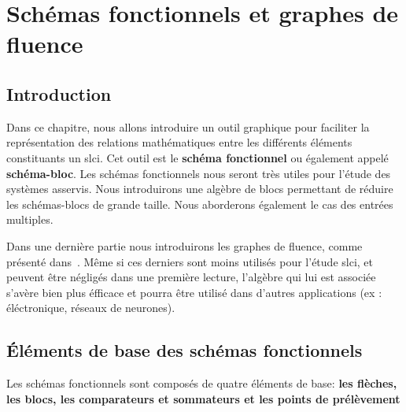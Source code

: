 \chapter[Schéma fonctionnels]{Schémas fonctionnels et graphes de fluence\label{chap-schemabloc}}

\minitoc
\newpage
\section{Introduction}
Dans ce chapitre, nous allons introduire un outil graphique pour faciliter 
la représentation des relations mathématiques entre les différents 
éléments constituants un \gls{slci}. Cet outil est le \textbf{schéma fonctionnel} ou 
également appelé \textbf{schéma-bloc}. Les schémas fonctionnels nous seront très 
utiles pour l'étude des systèmes asservis. Nous introduirons une algèbre de blocs permettant
de réduire les schémas-blocs de grande taille. Nous aborderons également le cas des entrées multiples. 

Dans une dernière partie nous introduirons 
les graphes de fluence, comme présenté dans~\cite{Ostertag}. Même si ces derniers 
sont moins utilisés pour l'étude \gls{slci}, et peuvent être négligés dans une première lecture,
l'algèbre qui lui est associée s'avère bien plus éfficace et pourra être utilisé dans d'autres 
applications (ex : éléctronique, réseaux de neurones).


\section{\'Eléments de base des schémas fonctionnels}
Les schémas fonctionnels sont composés de quatre éléments de base:
\textbf{les flèches, les blocs, les comparateurs et sommateurs et les points de prélèvement}

